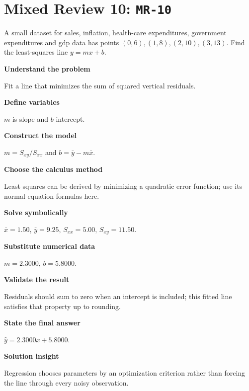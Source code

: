 \documentclass[11pt]{book}
\newcommand{\pid}[1]{\texttt{#1}}
\begin{document}
\section*{Mixed Review 10: \pid{MR-10}}
\begin{problembox}A small dataset for sales, inflation, health-care expenditures, government expenditures and gdp data has points $(0,6),(1,8),(2,10),(3,13)$. Find the least-squares line $y=mx+b$.\end{problembox}
\begin{solutionbox}
\textbf{Understand the problem}\par Fit a line that minimizes the sum of squared vertical residuals.\par\medskip
\textbf{Define variables}\par $m$ is slope and $b$ intercept.\par\medskip
\textbf{Construct the model}\par $m=S_{xy}/S_{xx}$ and $b=\bar y-m\bar x$.\par\medskip
\textbf{Choose the calculus method}\par Least squares can be derived by minimizing a quadratic error function; use its normal-equation formulas here.\par\medskip
\textbf{Solve symbolically}\par $\bar x=1.50$, $\bar y=9.25$, $S_{xx}=5.00$, $S_{xy}=11.50$.\par\medskip
\textbf{Substitute numerical data}\par $m=2.3000$, $b=5.8000$.\par\medskip
\textbf{Validate the result}\par Residuals should sum to zero when an intercept is included; this fitted line satisfies that property up to rounding.\par\medskip
\textbf{State the final answer}\par $\hat y=2.3000x+5.8000$.\par\medskip
\textbf{Solution insight}\par Regression chooses parameters by an optimization criterion rather than forcing the line through every noisy observation.\par\medskip
\end{solutionbox}
\end{document}
